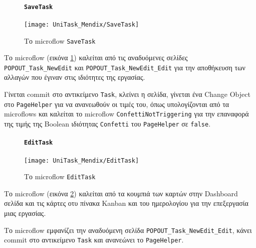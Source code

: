                 \begin{figure}[H] \noindent
                    \paragraph{\texttt{SaveTask}}
                    \begin{center}
                        \texttt{[image: UniTask\_Mendix/SaveTask]}
                        \caption{\centering Το microflow \texttt{SaveTask}}
                        \label{fig:unitask_SaveTask}
                    \end{center}
                \end{figure}

                Το microflow (εικόνα \ref{fig:unitask_SaveTask}) καλείται από τις αναδυόμενες σελίδες \texttt{POPOUT\_Task\_NewEdit} και \texttt{POPOUT\_Task\_NewEdit\_Edit} για την αποθήκευση των αλλαγών που έγιναν στις ιδιότητες της εργασίας.

                Γίνεται commit στο αντικείμενο \texttt{Task}, κλείνει η σελίδα, γίνεται ένα Change Object στο \texttt{PageHelper} για να ανανεωθούν οι τιμές του, όπως υπολογίζονται από τα microflows και καλείται το microflow \texttt{ConfettiNotTriggering} για την επαναφορά της τιμής της Boolean ιδιότητας \texttt{Confetti} του \texttt{PageHelper} σε \texttt{false}.

                \begin{figure}[H] \noindent
                    \paragraph{\texttt{EditTask}}
                    \begin{center}
                        \texttt{[image: UniTask\_Mendix/EditTask]}
                        \caption{\centering Το microflow \texttt{EditTask}}
                        \label{fig:unitask_EditTask}
                    \end{center}
                \end{figure}

                Το microflow (εικόνα \ref{fig:unitask_EditTask}) καλείται από τα κουμπιά των καρτών στην Dashboard σελίδα και τις κάρτες οτυ πίνακα Kanban και του ημερολογίου για την επεξεργασία μιας εργασίας.

                Το microflow εμφανίζει την αναδυόμενη σελίδα \texttt{POPOUT\_Task\_NewEdit\_Edit}, κάνει commit στο αντικείμενο \texttt{Task} και ανανεώνει το \texttt{PageHelper}.

